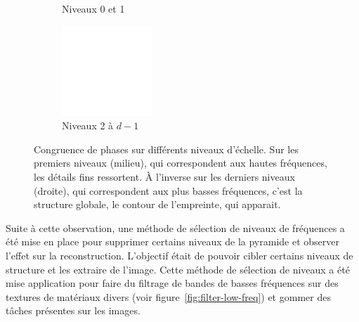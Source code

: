 \begin{figure}
\begin{subfigure}[b]{.25\textwidth}
        \caption{Niveaux 0 et 1}
    \end{subfigure}
    \hfill
    \begin{subfigure}[b]{.25\textwidth}
        \centering
        \includegraphics[width=\textwidth]{contenu/resources/images/pc_layer_2_depth-1}
        \caption{Niveaux 2 à $d-1$}
    \end{subfigure}

    \caption[Congruence de phases sur différents niveaux d'échelle]{Congruence de phases sur différents niveaux d'échelle. Sur les premiers niveaux (milieu), qui correspondent aux hautes fréquences, les détails fins ressortent. À l'inverse sur les derniers niveaux (droite), qui correspondent aux plus basses fréquences, c'est la structure globale, le contour de l'empreinte, qui apparait.}
    \label{fig:pc-selection-niveaux}
\end{figure}

Suite à cette observation, une méthode de sélection de niveaux de fréquences a été mise en place pour supprimer certains niveaux de la pyramide et observer l'effet sur la reconstruction. L'objectif était de pouvoir cibler certains niveaux de structure et les extraire de l'image. Cette méthode de sélection de niveaux a été mise application pour faire du filtrage de bandes de basses fréquences sur des textures de matériaux divers (voir figure~\ref{fig:filter-low-freq}) et gommer des tâches présentes sur les images.

